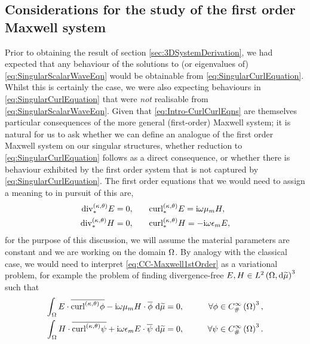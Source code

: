 \subsection{Considerations for the study of the first order Maxwell system} \label{ssec:CC-1stOrderMaxwell}
Prior to obtaining the result of section \ref{sec:3DSystemDerivation}, we had expected that any behaviour of the solutions to (or eigenvalues of) \eqref{eq:SingularScalarWaveEqn} would be obtainable from \eqref{eq:SingularCurlEquation}.
Whilst this is certainly the case, we were also expecting behaviours in \eqref{eq:SingularCurlEquation} that were \emph{not} realisable from \eqref{eq:SingularScalarWaveEqn}.
Given that \eqref{eq:Intro-CurlCurlEqns} are themselves particular consequences of the more general (first-order) Maxwell system; it is natural for us to ask whether we can define an analogue of the first order Maxwell system on our singular structures, whether reduction to \eqref{eq:SingularCurlEquation} follows as a direct consequence, or whether there is behaviour exhibited by the first order system that is not captured by \eqref{eq:SingularCurlEquation}.
The first order equations that we would need to assign a meaning to in pursuit of this are,
\begin{subequations} \label{eq:CC-Maxwell1stOrder}
	\begin{align}
		\mathrm{div}_{*}^{\left( \kappa, \theta \right)} E = 0,
		&\qquad
		\mathrm{curl}_{*}^{\left( \kappa, \theta \right)}E = \mathrm{i}\omega\mu_m H, \label{eq:CC-Maxwell1stOrderCurlE} \\
		\mathrm{div}_{*}^{\left( \kappa, \theta \right)} H = 0,
		&\qquad
		\mathrm{curl}_{*}^{\left( \kappa, \theta \right)}H = -\mathrm{i}\omega\epsilon_m E, \label{eq:CC-Maxwell1stOrderCurlH}
	\end{align}
\end{subequations}
for the purpose of this discussion, we will assume the material parameters are constant and we are working on the domain $\Omega$.
By analogy with the classical case, we would need to interpret \eqref{eq:CC-Maxwell1stOrder} as a variational problem, for example the problem of finding divergence-free $E,H\in L^{2}\left( \Omega,\mathrm{d} \widetilde{\mu} \right)^3$ such that
\begin{subequations} \label{eq:CC-Maxwell1stOrderVariational}
	\begin{align} 
		\int_{\Omega} E\cdot\overline{\mathrm{curl}_{}^{\left( \kappa, \theta \right)}\phi} - \mathrm{i}\omega\mu_m H\cdot\overline{\phi}  \ \mathrm{d}\widetilde{\mu} &= 0, 
		\qquad &\forall \phi\in C^{\infty}_{\#}\left( \Omega \right)^3, \\
		\int_{\Omega} H\cdot\overline{\mathrm{curl}_{}^{\left( \kappa, \theta \right)}\psi} + \mathrm{i}\omega\epsilon_m E\cdot\overline{\psi}  \ \mathrm{d}\widetilde{\mu} &= 0,
		\qquad &\forall \psi\in C^{\infty}_{\#}\left( \Omega \right)^3.
	\end{align}
\end{subequations}
